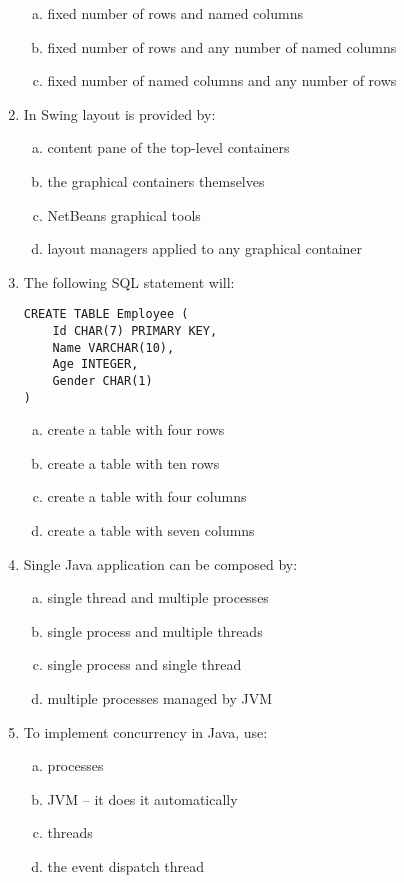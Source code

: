\documentclass[10pt,a4paper,twocolumn]{article}
\begin{document}
\begin{enumerate}
\begin{enumerate}[(a)]
	\item fixed number of rows and named columns
	\item fixed number of rows and any number of named columns
	\item fixed number of named columns and any number of rows
\end{enumerate}
\item In Swing layout is provided by:
\begin{enumerate}[(a)]
	\item content pane of the top-level containers
	\item the graphical containers themselves
	\item NetBeans graphical tools
	\item layout managers applied to any graphical container
\end{enumerate}
\item The following SQL statement will:
\begin{verbatim}
CREATE TABLE Employee (
    Id CHAR(7) PRIMARY KEY,
    Name VARCHAR(10),
    Age INTEGER,
    Gender CHAR(1)
)
\end{verbatim}
\begin{enumerate}[(a)]
	\item create a table with four rows
	\item create a table with ten rows
	\item create a table with four columns
	\item create a table with seven columns
\end{enumerate}
\item Single Java application can be composed by:
\begin{enumerate}[(a)]
	\item single thread and multiple processes
	\item single process and multiple threads
	\item single process and single thread
	\item multiple processes managed by JVM
\end{enumerate}
\item To implement concurrency in Java, use:
\begin{enumerate}[(a)]
	\item processes
	\item JVM -- it does it automatically
	\item threads
	\item the event dispatch thread
\end{enumerate}

\end{enumerate}
\end{document}
